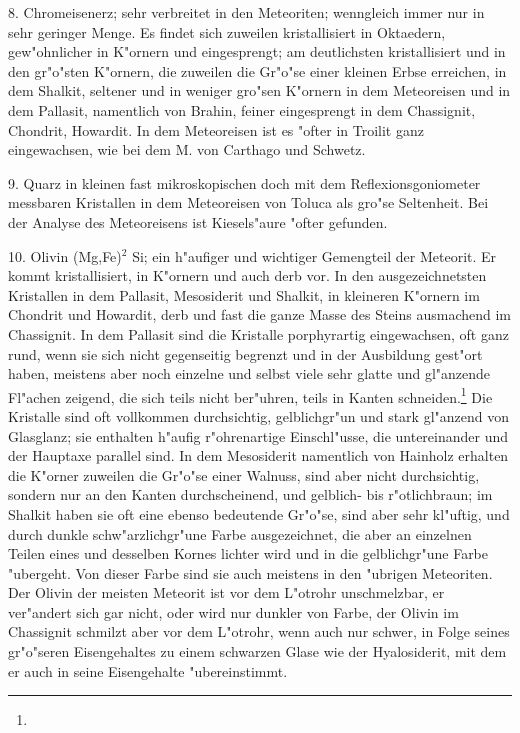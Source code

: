 \documentclass[a4paper, 11pt, oneside]{article}
\begin{document}
8. Chromeisenerz; sehr verbreitet in den Meteoriten; wenngleich immer nur in sehr geringer Menge. Es findet sich zuweilen kristallisiert in Oktaedern, gew"ohnlicher in K"ornern und eingesprengt; am deutlichsten kristallisiert und in den gr"o"sten K"ornern, die zuweilen die Gr"o"se einer kleinen Erbse erreichen, in dem Shalkit, seltener und in weniger gro"sen K"ornern in dem Meteoreisen und in dem Pallasit, namentlich von Brahin, feiner eingesprengt in dem Chassignit, Chondrit, Howardit. In dem Meteoreisen ist es "ofter in Troilit ganz eingewachsen, wie bei dem M. von Carthago und Schwetz.

9. Quarz in kleinen fast mikroskopischen doch mit dem Reflexionsgoniometer messbaren Kristallen in dem Meteoreisen von Toluca als gro"se Seltenheit. Bei der Analyse des Meteoreisens ist Kiesels"aure "ofter gefunden.

10. Olivin (Mg,Fe)$^{2}$ Si; ein h"aufiger und wichtiger Gemengteil der Meteorit. Er kommt kristallisiert, in K"ornern und auch derb vor. In den ausgezeichnetsten Kristallen in dem Pallasit, Mesosiderit und Shalkit, in kleineren K"ornern im Chondrit und Howardit, derb und fast die ganze Masse des Steins ausmachend im Chassignit. In dem Pallasit sind die Kristalle porphyrartig eingewachsen, oft ganz rund, wenn sie sich nicht gegenseitig begrenzt und in der Ausbildung gest"ort haben, meistens aber noch einzelne und selbst viele sehr glatte und gl"anzende Fl"achen zeigend, die sich teils nicht ber"uhren, teils in Kanten schneiden.\footnote{} Die Kristalle sind oft vollkommen durchsichtig, gelblichgr"un und stark gl"anzend von Glasglanz; sie enthalten h"aufig r"ohrenartige Einschl"usse, die untereinander und der Hauptaxe parallel sind. In dem Mesosiderit namentlich von Hainholz erhalten die K"orner zuweilen die Gr"o"se einer Walnuss, sind aber nicht durchsichtig, sondern nur an den Kanten durchscheinend, und gelblich- bis r"otlichbraun; im Shalkit haben sie oft eine ebenso bedeutende Gr"o"se, sind aber sehr kl"uftig, und durch dunkle schw"arzlichgr"une Farbe ausgezeichnet, die aber an einzelnen Teilen eines und desselben Kornes lichter wird und in die gelblichgr"une Farbe "ubergeht. Von dieser Farbe sind sie auch meistens in den "ubrigen Meteoriten. Der Olivin der meisten Meteorit ist vor dem L"otrohr unschmelzbar, er ver"andert sich gar nicht, oder wird nur dunkler von Farbe, der Olivin im Chassignit schmilzt aber vor dem L"otrohr, wenn auch nur schwer, in Folge seines gr"o"seren Eisengehaltes zu einem schwarzen Glase wie der Hyalosiderit, mit dem er auch in seine Eisengehalte "ubereinstimmt.
\end{document}
